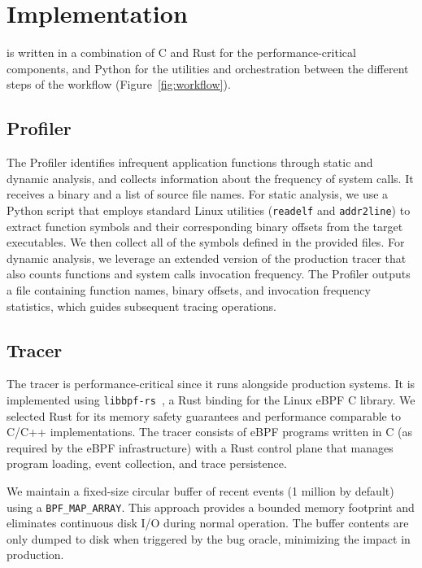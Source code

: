 \section{Implementation}
\label{sec:implementation}

\sys is written in a combination of C and Rust for the performance-critical components, and Python for the utilities and orchestration between the different steps of the workflow (Figure~\ref{fig:workflow}).


\subsection{Profiler}

The Profiler identifies infrequent application functions through static and dynamic analysis, and collects information about the frequency of system calls.
It receives a binary and a list of source file names.
For static analysis, we use a Python script that employs standard Linux utilities (\texttt{readelf} and \texttt{addr2line}) to extract function symbols and their corresponding binary offsets from the target executables.
We then collect all of the symbols defined in the provided files.
For dynamic analysis, we leverage an extended version of the production tracer that also counts functions and system calls invocation frequency.
The Profiler outputs a file containing function names, binary offsets, and invocation frequency statistics, which guides subsequent tracing operations.

\subsection{Tracer}

The tracer is performance-critical since it runs alongside production systems.
It is implemented using \texttt{libbpf-rs}~\cite{libbpfrs}, a Rust binding for the Linux eBPF C library.
We selected Rust for its memory safety guarantees and performance comparable to C/C++ implementations.
The tracer consists of eBPF programs written in C (as required by the eBPF infrastructure) with a Rust control plane that manages program loading, event collection, and trace persistence.

We maintain a fixed-size circular buffer of recent events (1 million by default) using a \texttt{BPF\_MAP\_ARRAY}.
This approach provides a bounded memory footprint and eliminates continuous disk I/O during normal operation.
The buffer contents are only dumped to disk when triggered by the bug oracle, minimizing the impact in production.

